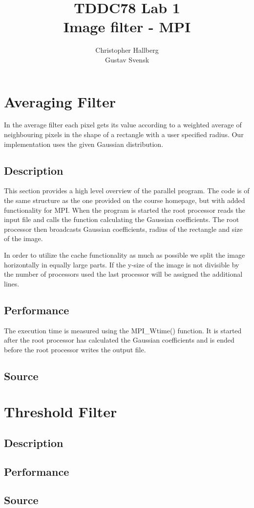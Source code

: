 \documentclass[a4paper, 12pt]{article}
\begin{document}
\title{TDDC78 Lab 1\\
        Image filter - MPI}
\author{Christopher Hallberg \\
        Gustav Svensk}
\maketitle

\thispagestyle{empty}

\newpage
\setcounter{page}{1}
\tableofcontents
\newpage

\section{Averaging Filter}
In the average filter each pixel gets its value according to a weighted average
of neighbouring pixels in the shape of a rectangle with a user specified radius. 
Our implementation uses the given Gaussian distribution.

\subsection{Description}
This section provides a high level overview of the parallel program. 
The code is of the same structure as the one provided on the course homepage,
but with added functionality for MPI. When the
program is started the root processor reads the input file and calls
the function calculating the Gaussian coefficients. The root processor then
broadcasts Gaussian coefficients, radius of the rectangle and size of the image.

In order to utilize the cache functionality as much as possible we split the image
horizontally in equally large parts. If the y-size of the image is not divisible
by the number of processors used the last processor will be assigned the
additional lines.   
 

\subsection{Performance}
The execution time is measured using the MPI\_Wtime() function. It is started
after the root processor has calculated the Gaussian
coefficients and is ended before the root processor writes the output file.

\subsection{Source}

\section{Threshold Filter}
\subsection{Description}
\subsection{Performance}
\subsection{Source}
\end{document}
